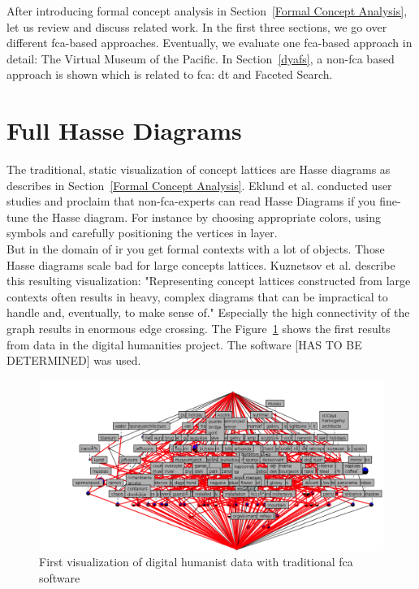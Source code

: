 \documentclass[11pt]{report}
\begin{document}
After introducing formal concept analysis in Section~\ref{Formal Concept Analysis}, let us review and discuss related work. In the first three sections, we go over different \acrshort{fca}-based approaches. Eventually, we evaluate one \acrshort{fca}-based approach in detail: The Virtual Museum of the Pacific. In Section~\ref{dyafs}, a non-\acrshort{fca} based approach is shown which is related to \acrshort{fca}: \acrshort{dt} and Faceted Search. \\

\section{Full Hasse Diagrams}

The traditional, static visualization of concept lattices are Hasse diagrams as describes in Section~\ref{Formal Concept Analysis}. Eklund et al. \cite{Eklund2004} conducted user studies and proclaim that non-\acrshort{fca}-experts can read Hasse Diagrams if you fine-tune the Hasse diagram. For instance by choosing appropriate colors, using symbols and carefully positioning the vertices in layer. \\

But in the domain of \acrshort{ir} you get formal contexts with a lot of objects. Those Hasse diagrams scale bad for large concepts lattices. Kuznetsov et al. \cite{Kuznetsov20072}  describe this resulting visualization: "Representing concept lattices constructed from large contexts often results in heavy, complex diagrams that can be impractical to handle and, eventually, to make sense of." Especially the high connectivity of the graph results in enormous edge crossing. The Figure~\ref{figure:firstVisualizaion} shows the first results from data in the digital humanities project. The software [HAS TO BE DETERMINED] was used. \\

\begin{figure}[!ht]
	\centering
	\includegraphics[width=\linewidth]{./images/firstVisualization}
\caption{First visualization of digital humanist data with traditional \acrshort{fca} software}
\label{figure:firstVisualizaion}
\end{figure}
\end{document}
